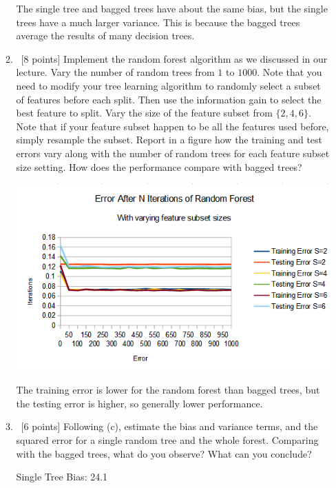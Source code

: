\documentclass[12pt, fullpage,letterpaper]{article}
\begin{document}
\begin{enumerate}
\begin{enumerate}
	\bigskip
	
	The single tree and bagged trees have about the same bias, but the single trees have a much larger variance. This is because the bagged trees average the results of many decision trees.	
	
	\bigskip
	\item~[8 points] Implement the random forest algorithm as we discussed in our lecture. Vary the number of random trees from $1$ to $1000$. Note that you need to modify your tree learning algorithm to randomly select a subset of features before each split. Then use the information gain to select the best feature to split.  Vary the size of the feature subset from $\{2, 4, 6\}$. Note that if your feature subset happen to be all the features used before, simply resample the subset.  Report in a figure how the training and test errors vary along with the number of random trees for each feature subset size setting. How does the performance compare with bagged trees? 

	\begin{center}
		\includegraphics[scale=0.8]{forest_graph}
	\end{center}
	
	The training error is lower for the random forest than bagged trees, but the testing error is higher, so generally lower performance.
	
	\bigskip
	
	\item~[6 points] Following (c), estimate the bias and variance terms, and the squared error for a single random tree and the whole forest.  Comparing with the bagged trees, what do you observe? What can you conclude?
	
	\bigskip
	Single Tree Bias: 24.1
	

\end{enumerate}
\end{enumerate}
\end{document}
